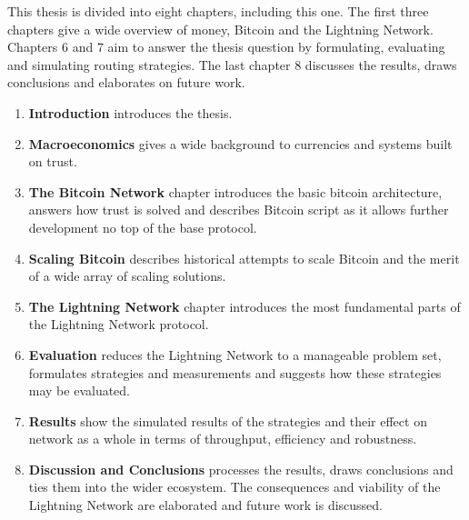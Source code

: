 This thesis is divided into eight chapters, including this one. The first three chapters give a wide overview of money, Bitcoin and the \gls{Lightning Network}. Chapters 6 and 7 aim to answer the thesis question by formulating, evaluating and simulating routing strategies. The last chapter 8 discusses the results, draws conclusions and elaborates on future work.

\begin{enumerate}
	\item \textbf{Introduction} introduces the thesis.
	\item \textbf{Macroeconomics} gives a wide background to currencies and systems built on trust. 
	\item \textbf{The Bitcoin Network} chapter introduces the basic \gls{bitcoin} architecture, answers how trust is solved and describes Bitcoin script as it allows further development no top of the base protocol.
	\item \textbf{Scaling Bitcoin} describes historical attempts to scale Bitcoin and the merit of a wide array of scaling solutions.
	\item \textbf{The \gls{Lightning Network}} chapter introduces the most fundamental parts of the Lightning Network protocol.
	\item \textbf{Evaluation} reduces the Lightning Network to a manageable problem set, formulates strategies and measurements and suggests how these strategies may be evaluated.
	\item \textbf{Results} show the simulated results of the strategies and their effect on network as a whole in terms of throughput, efficiency and robustness.
	\item \textbf{Discussion and Conclusions} processes the results, draws conclusions and ties them into the wider ecosystem. The consequences and viability of the Lightning Network are elaborated and future work is discussed.
\end{enumerate}